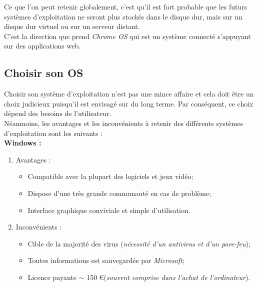 Ce que l'on peut retenir globalement, c'est qu'il est fort probable que les futurs
systèmes d'exploitation ne seront plus stockés dans le disque dur, mais sur un
disque dur virtuel ou sur un serveur distant. \\
C'est la direction que prend \textit{Chrome OS} qui est un système connecté
s’appuyant  sur des applications web.

\newpage

\subsection{Choisir son OS}
Choisir son système d'exploitation n'est pas une mince affaire et cela
doit être un choix judicieux puisqu'il est envisagé sur du long terme. Par
conséquent, ce choix dépend des besoins de l'utilisateur. \\
Néanmoins, les avantages et les inconvénients à retenir des différents systèmes
d'exploitation sont les suivants : \\

\textbf{Windows :}

\begin{enumerate}
\item Avantages : \\

  \begin{itemize}
  \item Compatible avec la plupart des logiciels et jeux vidéo; \\

  \item Dispose d'une très grande communauté en cas de problème; \\

  \item Interface graphique conviviale et simple d'utilisation. \\
  \end{itemize}

\item Inconvénients : \\
  \begin{itemize}
  \item Cible de la majorité des virus (\textit{nécessité d'un
antivirus et d'un pare-feu}); \\

  \item Toutes informations est sauvegardée par \textit{Microsoft}; \\

  \item Licence payante $\sim$ 150 \euro  (\textit{souvent comprise dans l'achat de l'ordinateur}).
\\
  \end{itemize}
\end{enumerate}

